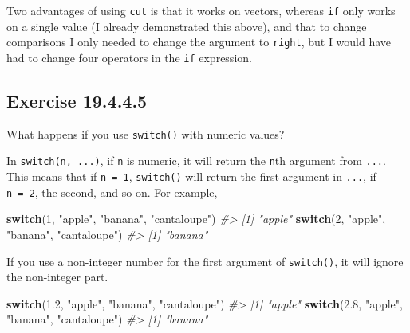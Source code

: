 \documentclass[]{book}
\newenvironment{Shaded}{\begin{snugshade}}{\end{snugshade}}
\newcommand{\CommentTok}[1]{\textcolor[rgb]{0.56,0.35,0.01}{\textit{#1}}}
\newcommand{\ControlFlowTok}[1]{\textcolor[rgb]{0.13,0.29,0.53}{\textbf{#1}}}
\newcommand{\DecValTok}[1]{\textcolor[rgb]{0.00,0.00,0.81}{#1}}
\newcommand{\FloatTok}[1]{\textcolor[rgb]{0.00,0.00,0.81}{#1}}
\newcommand{\NormalTok}[1]{#1}
\newcommand{\StringTok}[1]{\textcolor[rgb]{0.31,0.60,0.02}{#1}}
\theoremstyle{plain}
\theoremstyle{remark}
\begin{document}
Two advantages of using \texttt{cut} is that it works on vectors,
whereas \texttt{if} only works on a single value (I already demonstrated
this above), and that to change comparisons I only needed to change the
argument to \texttt{right}, but I would have had to change four
operators in the \texttt{if} expression.

\hypertarget{exercise-19.4.4.5}{%
\subsection*{\texorpdfstring{Exercise
{19.4.4.5}}{Exercise 19.4.4.5}}\label{exercise-19.4.4.5}}

What happens if you use \texttt{switch()} with numeric values?

In \texttt{switch(n,\ ...)}, if \texttt{n} is numeric, it will return
the \texttt{n}th argument from \texttt{...}. This means that if
\texttt{n\ =\ 1}, \texttt{switch()} will return the first argument in
\texttt{...}, if \texttt{n\ =\ 2}, the second, and so on. For example,

\begin{Shaded}
\begin{Highlighting}[]
\ControlFlowTok{switch}\NormalTok{(}\DecValTok{1}\NormalTok{, }\StringTok{"apple"}\NormalTok{, }\StringTok{"banana"}\NormalTok{, }\StringTok{"cantaloupe"}\NormalTok{)}
\CommentTok{#> [1] "apple"}
\ControlFlowTok{switch}\NormalTok{(}\DecValTok{2}\NormalTok{, }\StringTok{"apple"}\NormalTok{, }\StringTok{"banana"}\NormalTok{, }\StringTok{"cantaloupe"}\NormalTok{)}
\CommentTok{#> [1] "banana"}
\end{Highlighting}
\end{Shaded}

If you use a non-integer number for the first argument of
\texttt{switch()}, it will ignore the non-integer part.

\begin{Shaded}
\begin{Highlighting}[]
\ControlFlowTok{switch}\NormalTok{(}\FloatTok{1.2}\NormalTok{, }\StringTok{"apple"}\NormalTok{, }\StringTok{"banana"}\NormalTok{, }\StringTok{"cantaloupe"}\NormalTok{)}
\CommentTok{#> [1] "apple"}
\ControlFlowTok{switch}\NormalTok{(}\FloatTok{2.8}\NormalTok{, }\StringTok{"apple"}\NormalTok{, }\StringTok{"banana"}\NormalTok{, }\StringTok{"cantaloupe"}\NormalTok{)}
\CommentTok{#> [1] "banana"}
\end{Highlighting}
\end{Shaded}
\end{document}
